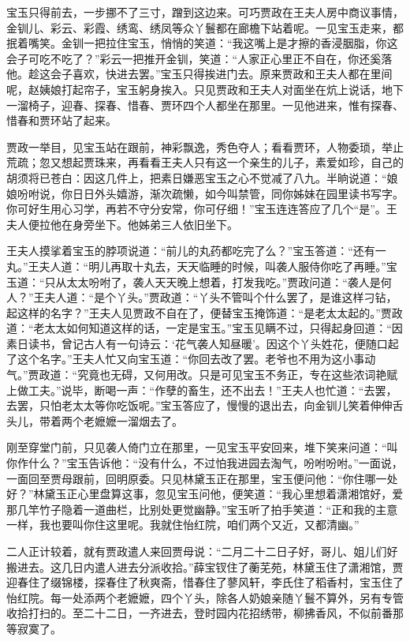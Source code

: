 \documentclass[12pt,oneside]{book}
\begin{document}
宝玉只得前去，一步挪不了三寸，蹭到这边来。可巧贾政在王夫人房中商议事情，金钏儿、彩云、彩霞、绣鸾、绣凤等众丫鬟都在廊檐下站着呢。一见宝玉走来，都抿着嘴笑。金钏一把拉住宝玉，悄悄的笑道：“我这嘴上是才擦的香浸胭脂，你这会子可吃不吃了？”彩云一把推开金钏，笑道：“人家正心里正不自在，你还奚落他。趁这会子喜欢，快进去罢。”宝玉只得挨进门去。原来贾政和王夫人都在里间呢，赵姨娘打起帘子，宝玉躬身挨入。只见贾政和王夫人对面坐在炕上说话，地下一溜椅子，迎春、探春、惜春、贾环四个人都坐在那里。一见他进来，惟有探春、惜春和贾环站了起来。

贾政一举目，见宝玉站在跟前，神彩飘逸，秀色夺人；看看贾环，人物委琐，举止荒疏；忽又想起贾珠来，再看看王夫人只有这一个亲生的儿子，素爱如珍，自己的胡须将已苍白：因这几件上，把素日嫌恶宝玉之心不觉减了八九。半晌说道：“娘娘吩咐说，你日日外头嬉游，渐次疏懒，如今叫禁管，同你姊妹在园里读书写字。你可好生用心习学，再若不守分安常，你可仔细！”宝玉连连答应了几个“是”。王夫人便拉他在身旁坐下。他姊弟三人依旧坐下。

王夫人摸挲着宝玉的脖项说道：“前儿的丸药都吃完了么？”宝玉答道：“还有一丸。”王夫人道：“明儿再取十丸去，天天临睡的时候，叫袭人服侍你吃了再睡。”宝玉道：“只从太太吩咐了，袭人天天晚上想着，打发我吃。”贾政问道：“袭人是何人？”王夫人道：“是个丫头。”贾政道：“丫头不管叫个什么罢了，是谁这样刁钻，起这样的名字？”王夫人见贾政不自在了，便替宝玉掩饰道：“是老太太起的。”贾政道：“老太太如何知道这样的话，一定是宝玉。”宝玉见瞒不过，只得起身回道：“因素日读书，曾记古人有一句诗云：‘花气袭人知昼暖’。因这个丫头姓花，便随口起了这个名字。”王夫人忙又向宝玉道：“你回去改了罢。老爷也不用为这小事动气。”贾政道：“究竟也无碍，又何用改。只是可见宝玉不务正，专在这些浓词艳赋上做工夫。”说毕，断喝一声：“作孽的畜生，还不出去！”王夫人也忙道：“去罢，去罢，只怕老太太等你吃饭呢。”宝玉答应了，慢慢的退出去，向金钏儿笑着伸伸舌头儿，带着两个老嬷嬷一溜烟去了。

刚至穿堂门前，只见袭人倚门立在那里，一见宝玉平安回来，堆下笑来问道：“叫你作什么？”宝玉告诉他：“没有什么，不过怕我进园去淘气，吩咐吩咐。”一面说，一面回至贾母跟前，回明原委。只见林黛玉正在那里，宝玉便问他：“你住哪一处好？”林黛玉正心里盘算这事，忽见宝玉问他，便笑道：“我心里想着潇湘馆好，爱那几竿竹子隐着一道曲栏，比别处更觉幽静。”宝玉听了拍手笑道：“正和我的主意一样，我也要叫你住这里呢。我就住怡红院，咱们两个又近，又都清幽。”

二人正计较着，就有贾政遣人来回贾母说：“二月二十二日子好，哥儿、姐儿们好搬进去。这几日内遣人进去分派收拾。”薛宝钗住了蘅芜苑，林黛玉住了潇湘馆，贾迎春住了缀锦楼，探春住了秋爽斋，惜春住了蓼风轩，李氏住了稻香村，宝玉住了怡红院。每一处添两个老嬷嬷，四个丫头，除各人奶娘亲随丫鬟不算外，另有专管收拾打扫的。至二十二日，一齐进去，登时园内花招绣带，柳拂香风，不似前番那等寂寞了。
\end{document}
